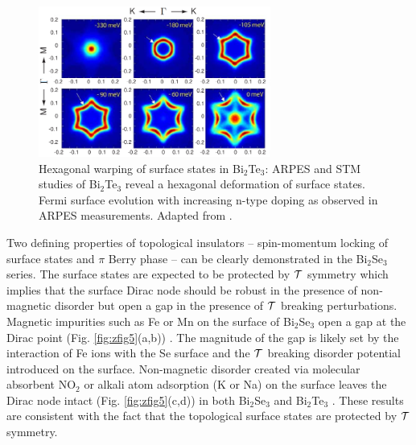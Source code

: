 \documentclass[twocolumn,floatfix,showpacs,rmp,aps]{revtex4}
\begin{document}
	\begin{figure}
		\includegraphics[width=3in]{Fig14}
		\caption{Hexagonal warping of
			surface states in Bi$_2$Te$_3$: ARPES and STM studies of Bi$_2$Te$_3$
			reveal a hexagonal deformation of surface states.  Fermi surface evolution with
			increasing n-type doping as observed in ARPES measurements.  Adapted from
			.}
		\label{fig:zfig8}
	\end{figure}
	
	Two defining properties of topological insulators --
	spin-momentum locking of surface states and $\pi$ Berry phase -- can
	be clearly demonstrated in the Bi$_2$Se$_3$ series.
	The surface states are expected to be protected by ${\cal T}$ symmetry
	which implies that the surface Dirac node should be robust in
	the presence of non-magnetic disorder but open a gap in the presence
	of ${\cal T}$ breaking perturbations.
	Magnetic impurities such as Fe or Mn on the surface of Bi$_2$Se$_3$ open a gap at the
	Dirac point (Fig. \ref{fig:zfig5}(a,b)) \cite{xia08,hsieh09b,hor10b,wray10}.
	The magnitude of the gap is
	likely set by the interaction of Fe ions with the Se surface and the
	${\cal T}$ breaking disorder potential introduced on the surface.
	Non-magnetic disorder created via molecular absorbent NO$_2$ or
	alkali atom adsorption (K or Na) on the surface leaves the Dirac node
	intact (Fig. \ref{fig:zfig5}(c,d)) in both Bi$_2$Se$_3$ and Bi$_2$Te$_3$
	\cite{xia09b,hsieh09b}. These results
	are consistent with the fact that the topological surface states are
	protected by ${\cal T}$ symmetry.
	
\end{document}
